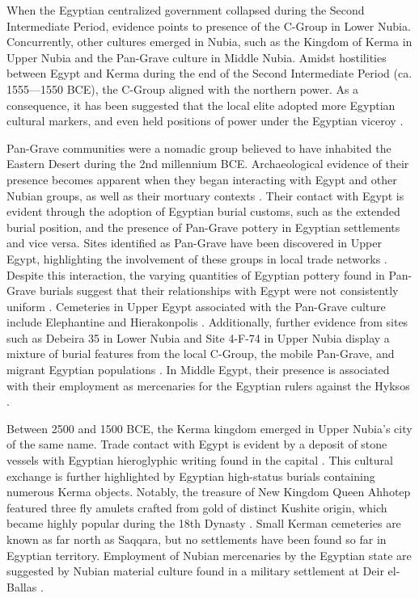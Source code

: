 When the Egyptian centralized government collapsed during the Second Intermediate Period, evidence points to presence of the C-Group in Lower Nubia. Concurrently, other cultures emerged in Nubia, such as the Kingdom of Kerma in Upper Nubia and the Pan-Grave culture in Middle Nubia. Amidst hostilities between Egypt and Kerma during the end of the Second Intermediate Period (ca. 1555—1550 BCE), the C-Group aligned with the northern power. As a consequence, it has been suggested that the local elite adopted more Egyptian cultural markers, and even held positions of power under the Egyptian viceroy \parencites{hafsaas-tsakosKushEgyptCGroup2010}{hafsaasCGroupPeopleLower2020}.

Pan-Grave communities were a nomadic group believed to have inhabited the Eastern Desert during the 2nd millennium BCE. Archaeological evidence of their presence becomes apparent when they began interacting with Egypt and other Nubian groups, as well as their mortuary contexts \parencites[p.~81, 89]{naserNomadsNileArchaeology2012}[p.~175]{souzaNotMarginalMarginalised2022}. Their contact with Egypt is evident through the adoption of Egyptian burial customs, such as the extended burial position, and the presence of Pan-Grave pottery in Egyptian settlements and vice versa. Sites identified as Pan-Grave have been discovered in Upper Egypt, highlighting the involvement of these groups in local trade networks \parencite[p.~125-126]{souzaBlurringBoundariesMore2024}. Despite this interaction, the varying quantities of Egyptian pottery found in Pan-Grave burials suggest that their relationships with Egypt were not consistently uniform \parencite[p.~229, 237]{liszkaPanGraveMedjayIntersection2020}. Cemeteries in Upper Egypt associated with the Pan-Grave culture include Elephantine and Hierakonpolis \parencite[p.~294]{meurerNubiansEgyptEarly2020}. Additionally, further evidence from sites such as Debeira 35 in Lower Nubia and Site 4-F-74 in Upper Nubia display a mixture of burial features from the local C-Group, the mobile Pan-Grave, and migrant Egyptian populations \parencite[p.~375]{smithNubianExperienceEgyptian2020}. In Middle Egypt, their presence is associated with their employment as mercenaries for the Egyptian rulers against the Hyksos \parencite[p.~295-296]{meurerNubiansEgyptEarly2020}.

Between 2500 and 1500 BCE, the Kerma kingdom emerged in Upper Nubia's city of the same name. Trade contact with Egypt is evident by a deposit of stone vessels with Egyptian hieroglyphic writing found in the capital \parencite[p.~114]{emberlingEarlyKushKingdom2022}. This cultural exchange is further highlighted by Egyptian high-status burials containing numerous Kerma objects. Notably, the treasure of New Kingdom Queen Ahhotep featured three fly amulets crafted from gold of distinct Kushite origin, which became highly popular during the 18th Dynasty \parencite[p.~188]{Williams2020c}. Small Kerman cemeteries are known as far north as Saqqara, but no settlements have been found so far in Egyptian territory. Employment of Nubian mercenaries by the Egyptian state are suggested by Nubian material culture found in a military settlement at Deir el-Ballas \parencite[p.298-300]{meurerNubiansEgyptEarly2020}.

